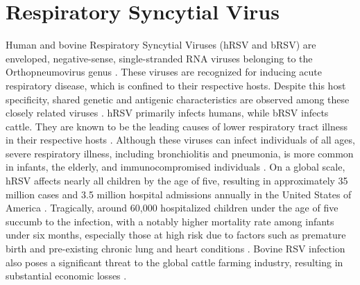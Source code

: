 \section{Respiratory Syncytial Virus} \label{sec:Respiratory Syncytial Virus}
Human and bovine Respiratory Syncytial Viruses (hRSV and bRSV) are enveloped, negative-sense, single-stranded RNA viruses belonging to the Orthopneumovirus genus \cite{Afonso2016Taxonomy2016}. These viruses are recognized for inducing acute respiratory disease, which is confined to their respective hosts. Despite this host specificity, shared genetic and antigenic characteristics are observed among these closely related viruses \cite{Buchholz2000ChimericVaccine}. hRSV primarily infects humans, while bRSV infects cattle. They are known to be the leading causes of lower respiratory tract illness in their respective hosts \cite{Nair2013GlobalAnalysis, Sacco2014RespiratoryCattle}. Although these viruses can infect individuals of all ages, severe respiratory illness, including bronchiolitis and pneumonia, is more common in infants, the elderly, and immunocompromised individuals \cite{Falsey2005RespiratoryAdults, Coultas2019RespiratoryAge}. On a global scale, hRSV affects nearly all children by the age of five, resulting in approximately 35 million cases and 3.5 million hospital admissions annually in the United States of America \cite{Shi2017GlobalStudy}. Tragically, around 60,000 hospitalized children under the age of five succumb to the infection, with a notably higher mortality rate among infants under six months, especially those at high risk due to factors such as premature birth and pre-existing chronic lung and heart conditions \cite{Shi2017GlobalStudy, Jha2016RespiratoryVirus, Coultas2019RespiratoryAge}. Bovine RSV infection also poses a significant threat to the global cattle farming industry, resulting in substantial economic losses \cite{Brodersen2010BovineVirus, Valarcher2007BovineInfection}.

